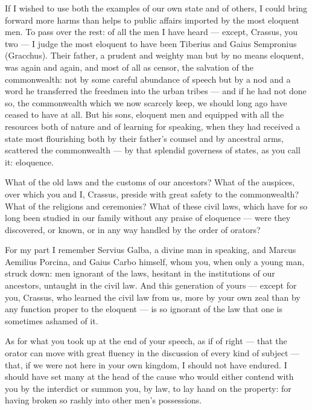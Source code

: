  If I wished to use both the examples of our own state and of others, I could bring forward more harms than helps to public affairs imported by the most eloquent men. To pass over the rest: of all the men I have heard — except, Crassus, you two — I judge the most eloquent to have been Tiberius and Gaius Sempronius (Gracchus). Their father, a prudent and weighty man but by no means eloquent, was again and again, and most of all as censor, the salvation of the commonwealth: not by some careful abundance of speech but by a nod and a word he transferred the freedmen into the urban tribes — and if he had not done so, the commonwealth which we now scarcely keep, we should long ago have ceased to have at all. But his sons, eloquent men and equipped with all the resources both of nature and of learning for speaking, when they had received a state most flourishing both by their father's counsel and by ancestral arms, scattered the commonwealth — by that splendid governess of states, as you call it: eloquence.

 What of the old laws and the customs of our ancestors? What of the auspices, over which you and I, Crassus, preside with great safety to the commonwealth? What of the religions and ceremonies? What of these civil laws, which have for so long been studied in our family without any praise of eloquence — were they discovered, or known, or in any way handled by the order of orators?

 For my part I remember Servius Galba, a divine man in speaking, and Marcus Aemilius Porcina, and Gaius Carbo himself, whom you, when only a young man, struck down: men ignorant of the laws, hesitant in the institutions of our ancestors, untaught in the civil law. And this generation of yours — except for you, Crassus, who learned the civil law from us, more by your own zeal than by any function proper to the eloquent — is so ignorant of the law that one is sometimes ashamed of it.

 As for what you took up at the end of your speech, as if of right — that the orator can move with great fluency in the discussion of every kind of subject — that, if we were not here in your own kingdom, I should not have endured. I should have set many at the head of the cause who would either contend with you by the interdict or summon you, by law, to lay hand on the property: for having broken so rashly into other men's possessions.

